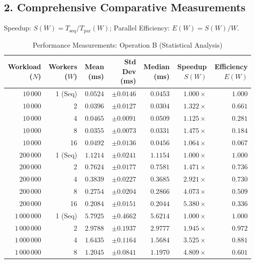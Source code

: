 \documentclass[11pt]{article}
\begin{document}
\subsection*{2. Comprehensive Comparative Measurements}
Speedup: $S(W) = T_{\text{seq}} / T_{\text{par}}(W)$; Parallel Efficiency: $E(W) = S(W) / W$.

\begin{table}[h!]
\centering
\scriptsize
\caption{Performance Measurements: Operation B (Statistical Analysis)}
\label{tab:stats_perf}
\begin{tabular}{r r r r r r r}
\toprule
\textbf{Workload ($N$)} & \textbf{Workers ($W$)} & \textbf{Mean (ms)} & \textbf{Std Dev (ms)} & \textbf{Median (ms)} & \textbf{Speedup $S(W)$} & \textbf{Efficiency $E(W)$} \\
\midrule
$10\,000$ & 1 (Seq) & $0.0524$ & $\pm 0.0146$ & $0.0453$ & $1.000\times$ & $1.000$ \\
$10\,000$ & 2       & $0.0396$ & $\pm 0.0127$ & $0.0304$ & $1.322\times$ & $0.661$ \\
$10\,000$ & 4       & $0.0465$ & $\pm 0.0091$ & $0.0509$ & $1.125\times$ & $0.281$ \\
$10\,000$ & 8       & $0.0355$ & $\pm 0.0073$ & $0.0331$ & $1.475\times$ & $0.184$ \\
$10\,000$ & 16      & $0.0492$ & $\pm 0.0136$ & $0.0456$ & $1.064\times$ & $0.067$ \\
\midrule
$200\,000$ & 1 (Seq) & $1.1214$ & $\pm 0.0241$ & $1.1154$ & $1.000\times$ & $1.000$ \\
$200\,000$ & 2       & $0.7624$ & $\pm 0.0177$ & $0.7581$ & $1.471\times$ & $0.736$ \\
$200\,000$ & 4       & $0.3839$ & $\pm 0.0227$ & $0.3685$ & $2.921\times$ & $0.730$ \\
$200\,000$ & 8       & $0.2754$ & $\pm 0.0204$ & $0.2866$ & $4.073\times$ & $0.509$ \\
$200\,000$ & 16      & $0.2084$ & $\pm 0.0151$ & $0.2044$ & $5.380\times$ & $0.336$ \\
\midrule
$1\,000\,000$ & 1 (Seq) & $5.7925$ & $\pm 0.4662$ & $5.6214$ & $1.000\times$ & $1.000$ \\
$1\,000\,000$ & 2       & $2.9788$ & $\pm 0.1937$ & $2.9777$ & $1.945\times$ & $0.972$ \\
$1\,000\,000$ & 4       & $1.6435$ & $\pm 0.1164$ & $1.5684$ & $3.525\times$ & $0.881$ \\
$1\,000\,000$ & 8       & $1.2045$ & $\pm 0.0841$ & $1.1970$ & $4.809\times$ & $0.601$ \\

\end{tabular}
\end{table}
\end{document}
